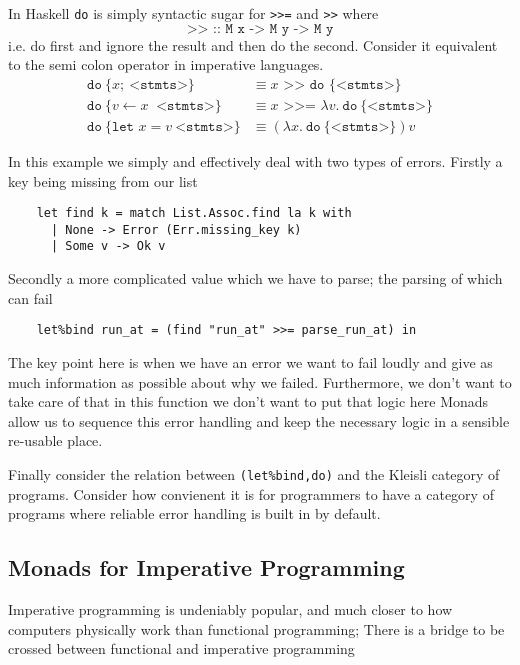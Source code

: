 In Haskell \texttt{do} is simply syntactic sugar for \texttt{>>=} and \texttt{>>} where
\begin{equation}
    \texttt{>> :: M x -> M y -> M y}
\end{equation}
i.e. do first and ignore the result and then do the second.
Consider it equivalent to the semi colon operator in imperative languages.
\begin{align}
    \texttt{do}\ \{ x;\ \texttt{<stmts>} \}
    &\equiv x \texttt{ >> do \{<stmts>\}}
    \\
    \texttt{do}\ \{ v \leftarrow x\ \texttt{ <stmts>}\}
    &\equiv x \texttt{ >>= } \lambda v.\ \texttt{do}\ \{ \texttt{<stmts>} \}
    \\
    \texttt{do}\ \{\texttt{let }x = v\ \texttt{<stmts>}\}
    &\equiv (\lambda x.\ \texttt{do}\ \{ \texttt{<stmts>} \})v
\end{align}

In this example we simply and effectively deal with two types of errors.
Firstly a key being missing from our list
\begin{verbatim}
    let find k = match List.Assoc.find la k with
      | None -> Error (Err.missing_key k)
      | Some v -> Ok v
\end{verbatim}
Secondly a more complicated value which we have to parse;
the parsing of which can fail
\begin{verbatim}
    let%bind run_at = (find "run_at" >>= parse_run_at) in
\end{verbatim}
The key point here is when we have an error we want to fail
loudly and give as much information as possible about why we failed.
Furthermore, we don't want to take care of that in this function
we don't want to put that logic here
Monads allow us to sequence this error handling
and keep the necessary logic in a sensible re-usable place.

Finally consider the relation between
\texttt{(let\%bind,do)} and the Kleisli category of programs.
Consider how convienent it is for programmers to have a category
of programs where reliable error handling is built in by default.

\subsection{Monads for Imperative Programming}
Imperative programming is undeniably popular,
and much closer to how computers physically work than functional programming;
There is a bridge to be crossed between functional and imperative programming

